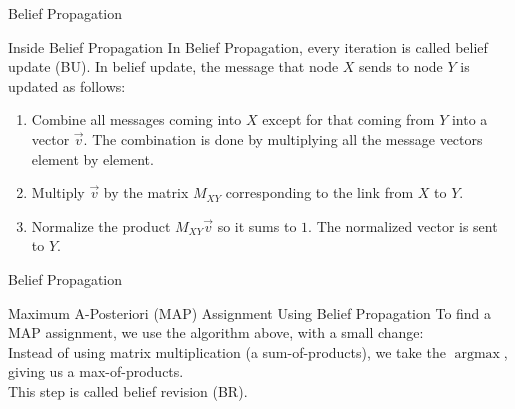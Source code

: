 \documentclass{beamer}
\begin{document}
\begin{frame}{Belief Propagation}
    \begin{block}{Inside Belief Propagation}
        In Belief Propagation, every iteration is called \alert{belief update (BU)}. In belief update, the message
        that node $ X $ sends to node $ Y $ is updated as follows:
        \pause
        \begin{enumerate}[<+->]
            \item Combine all messages coming into $ X $ except for that coming from $ Y $ into a vector $ \vec{v} $. The combination is done by multiplying all the message vectors element by element.
            \item Multiply $ \vec{v} $ by the matrix $ M_{XY} $ corresponding to the link from $ X $ to $ Y $.
            \item Normalize the product $ M_{XY}\vec{v} $ so it sums to $ 1 $. The normalized vector is sent to $ Y $.
        \end{enumerate}
    \end{block}
\end{frame}
\begin{frame}{Belief Propagation}
    \begin{block}{Maximum A-Posteriori (MAP) Assignment Using Belief Propagation}
        To find a MAP assignment, we use the algorithm above, with a small change:\\
        Instead of using matrix multiplication (a sum-of-products), we take the $ \operatorname{argmax} $, giving us a max-of-products.\\
        This step is called \alert{belief revision (BR)}.
    \end{block}
\end{frame}

\end{document}
